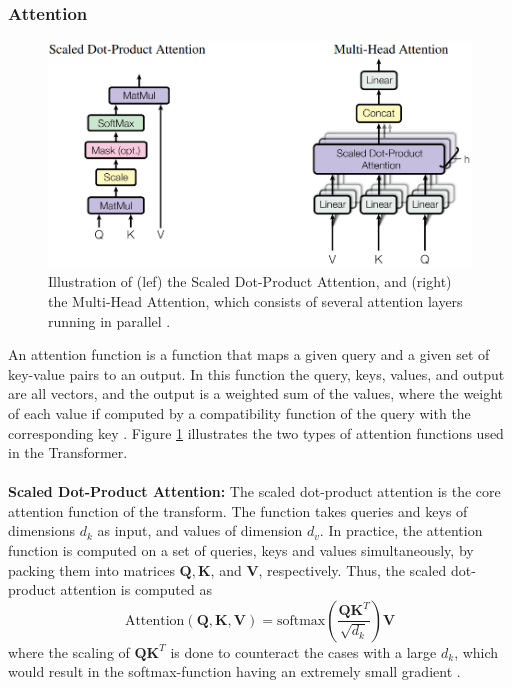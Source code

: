 \documentclass[./main.tex]{subfiles}
\begin{document}
\subsubsection{Attention}
\begin{figure}[htbp]
    \centering
    \includegraphics[width = 0.5 \textwidth]{./entities/attention.PNG}
    \caption{Illustration of (lef) the Scaled Dot-Product Attention, and (right) the Multi-Head Attention, which consists of several attention layers running in parallel \cite{https://doi.org/10.48550/arxiv.1706.03762}.}
    \label{fig:attention_illustration}
\end{figure}
An attention function is a function that maps a given query and a given set of key-value pairs to an output. In this function the query, keys, values, and output are all vectors, and the output is a weighted sum of the values, where the weight of each value if computed by a compatibility function of the query with the corresponding key \cite{https://doi.org/10.48550/arxiv.1706.03762}. Figure \ref{fig:attention_illustration} illustrates the two types of attention functions used in the Transformer.
\\
\\
\textbf{Scaled Dot-Product Attention:} The scaled dot-product attention is the core attention function of the transform. The function takes queries and keys of dimensions $d_k$ as input, and values of dimension $d_v$. In practice, the attention function is computed on a set of queries, keys and values simultaneously, by packing them into matrices $\bm{Q}, \bm{K}$, and $\bm{V}$, respectively. Thus, the scaled dot-product attention is computed as
\begin{equation}
    \text{Attention}(\bm{Q}, \bm{K}, \bm{V}) = \text{softmax}\left( \frac{\bm{Q}\bm{K}^T}{\sqrt{d_k}} \right) \bm{V}
\end{equation} 
where the scaling of $\bm{Q}\bm{K}^T$ is done to counteract the cases with a large $d_k$, which would result in the softmax-function having an extremely small gradient \cite{https://doi.org/10.48550/arxiv.1706.03762}.
\\
\\
\end{document}
